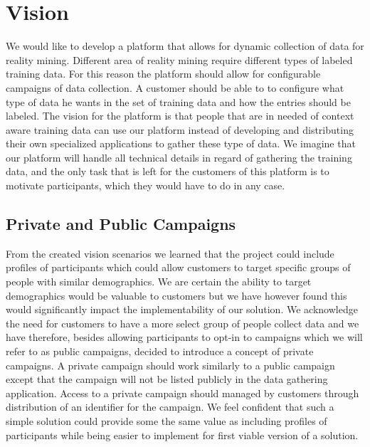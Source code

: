\section{Vision}
\label{sec:vision}

We would like to develop a platform that allows for dynamic collection of data for reality mining. Different area of reality mining require different types of labeled training data. For this reason the platform should allow for configurable campaigns of data collection. A customer should be able to to configure what type of data he wants in the set of training data and how the entries should be labeled. The vision for the platform is that people that are in needed of context aware training data can use our platform instead of developing and distributing their own specialized applications to gather these type of data. We imagine that our platform will handle all technical details in regard of gathering the training data, and the only task that is left for the customers of this platform is to motivate participants, which they would have to do in any case.

\subsection{Private and Public Campaigns}
\label{sub:private_and_public_campaigns}

From the created vision scenarios we learned that the project could include profiles of participants which could allow customers to target specific groups of people with similar demographics. We are certain the ability to target demographics would be valuable to customers but we have however found this would significantly impact the implementability of our solution. We acknowledge the need for customers to have a more select group of people collect data and we have therefore, besides allowing participants to opt-in to campaigns which we will refer to as public campaigns, decided to introduce a concept of private campaigns. A private campaign should work similarly to a public campaign except that the campaign will not be listed publicly in the data gathering application. Access to a private campaign should managed by customers through distribution of an identifier for the campaign. We feel confident that such a simple solution could provide some the same value as including profiles of participants while being easier to implement for first viable version of a solution.   


